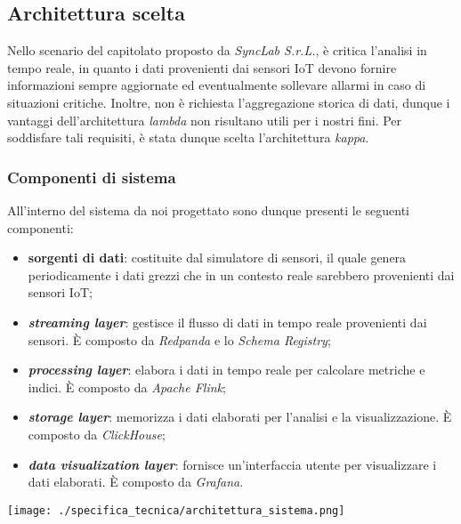 \subsection{Architettura scelta}
Nello scenario del capitolato proposto da \textit{SyncLab S.r.L.}, è critica l'analisi in tempo reale, in quanto i dati provenienti dai sensori IoT devono fornire informazioni sempre aggiornate ed eventualmente
sollevare allarmi in caso di situazioni critiche. Inoltre, non è richiesta l'aggregazione storica di dati, dunque i vantaggi dell'architettura \textit{lambda} non risultano utili per i nostri fini.
Per soddisfare tali requisiti, è stata dunque scelta l'architettura \textit{kappa}.

\subsubsection{Componenti di sistema}
All'interno del sistema da noi progettato sono dunque presenti le seguenti componenti:
\begin{itemize}
	\item \textbf{sorgenti di dati}: costituite dal simulatore di sensori, il quale genera periodicamente i dati grezzi che in un contesto reale sarebbero provenienti dai sensori IoT;
	\item \textbf{\textit{streaming layer}}: gestisce il flusso di dati in tempo reale provenienti dai sensori. È composto da \textit{Redpanda} e lo \textit{Schema Registry};
	\item \textbf{\textit{processing layer}}: elabora i dati in tempo reale per calcolare metriche e indici. È composto da \textit{Apache Flink};
	\item \textbf{\textit{storage layer}}: memorizza i dati elaborati per l'analisi e la visualizzazione. È composto da \textit{ClickHouse};
	\item \textbf{\textit{data visualization layer}}: fornisce un'interfaccia utente per visualizzare i dati elaborati. È composto da \textit{Grafana}.
\end{itemize}

\begin{center}
	\texttt{[image: ./specifica\_tecnica/architettura\_sistema.png]}
\end{center}

